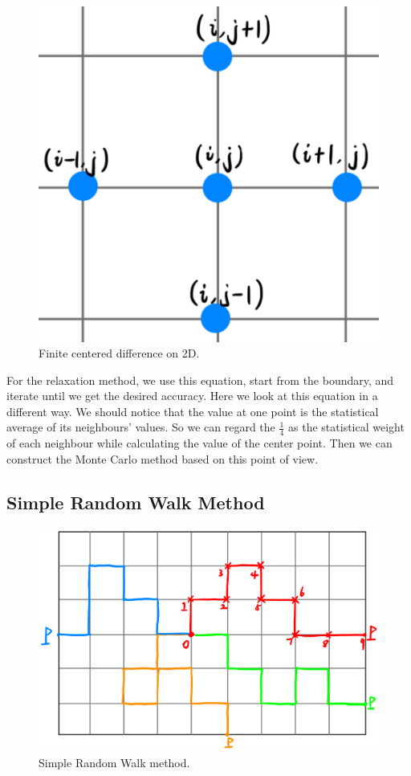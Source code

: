 \documentclass[aps, prl, preprint, groupedaddress]{revtex4-1}
\begin{document}
\begin{figure}[htbp]
    \centering
    \includegraphics[width=.8\textwidth]{./figs/disc}
    \caption{\label{fig:disc} Finite centered difference on 2D.}
\end{figure}

For the relaxation method, we use this equation, start from the boundary, and iterate until we get the desired accuracy. Here we look at this equation in a different way. We should notice that the value at one point is the statistical average of its neighbours' values. So we can regard the $\frac{1}{4}$ as the statistical weight of each neighbour while calculating the value of the center point. Then we can construct the Monte Carlo method based on this point of view.

\subsection{Simple Random Walk Method}

\begin{figure}[htbp]
    \centering
    \includegraphics[width=.8\textwidth]{./figs/srw}
    \caption{\label{fig:srw} Simple Random Walk method.}
\end{figure}
\end{document}

